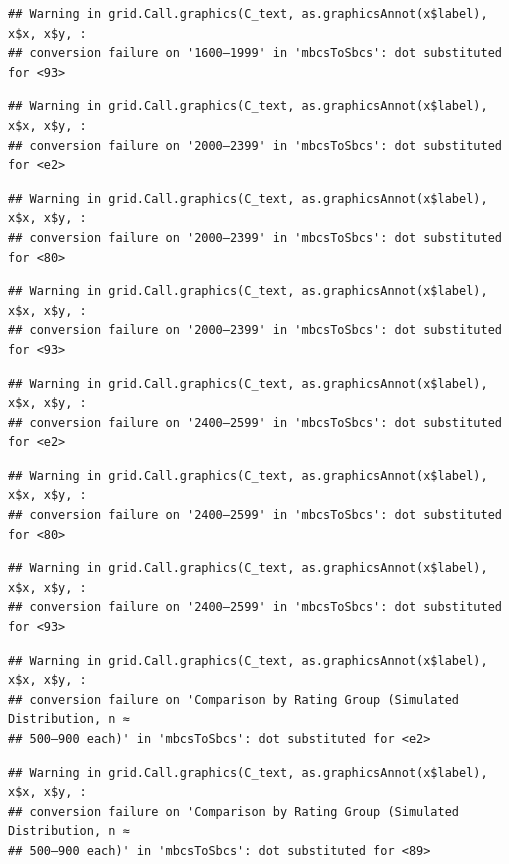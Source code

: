 \documentclass[
]{article}
\begin{document}
\begin{verbatim}
## Warning in grid.Call.graphics(C_text, as.graphicsAnnot(x$label), x$x, x$y, :
## conversion failure on '1600–1999' in 'mbcsToSbcs': dot substituted for <93>
\end{verbatim}

\begin{verbatim}
## Warning in grid.Call.graphics(C_text, as.graphicsAnnot(x$label), x$x, x$y, :
## conversion failure on '2000–2399' in 'mbcsToSbcs': dot substituted for <e2>
\end{verbatim}

\begin{verbatim}
## Warning in grid.Call.graphics(C_text, as.graphicsAnnot(x$label), x$x, x$y, :
## conversion failure on '2000–2399' in 'mbcsToSbcs': dot substituted for <80>
\end{verbatim}

\begin{verbatim}
## Warning in grid.Call.graphics(C_text, as.graphicsAnnot(x$label), x$x, x$y, :
## conversion failure on '2000–2399' in 'mbcsToSbcs': dot substituted for <93>
\end{verbatim}

\begin{verbatim}
## Warning in grid.Call.graphics(C_text, as.graphicsAnnot(x$label), x$x, x$y, :
## conversion failure on '2400–2599' in 'mbcsToSbcs': dot substituted for <e2>
\end{verbatim}

\begin{verbatim}
## Warning in grid.Call.graphics(C_text, as.graphicsAnnot(x$label), x$x, x$y, :
## conversion failure on '2400–2599' in 'mbcsToSbcs': dot substituted for <80>
\end{verbatim}

\begin{verbatim}
## Warning in grid.Call.graphics(C_text, as.graphicsAnnot(x$label), x$x, x$y, :
## conversion failure on '2400–2599' in 'mbcsToSbcs': dot substituted for <93>
\end{verbatim}

\begin{verbatim}
## Warning in grid.Call.graphics(C_text, as.graphicsAnnot(x$label), x$x, x$y, :
## conversion failure on 'Comparison by Rating Group (Simulated Distribution, n ≈
## 500–900 each)' in 'mbcsToSbcs': dot substituted for <e2>
\end{verbatim}

\begin{verbatim}
## Warning in grid.Call.graphics(C_text, as.graphicsAnnot(x$label), x$x, x$y, :
## conversion failure on 'Comparison by Rating Group (Simulated Distribution, n ≈
## 500–900 each)' in 'mbcsToSbcs': dot substituted for <89>
\end{verbatim}
\end{document}

